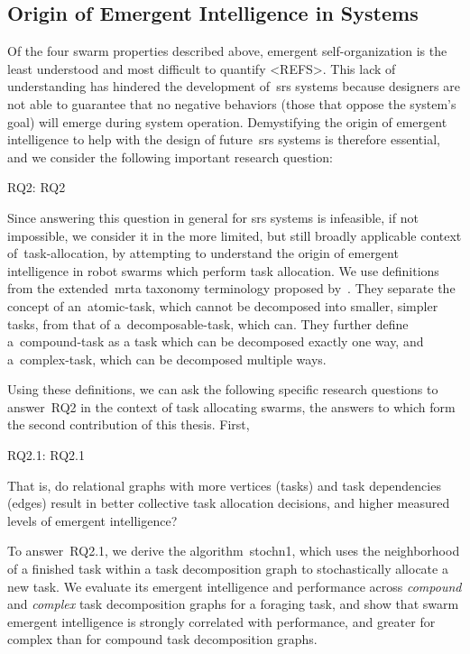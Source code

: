 \subsection{Origin of Emergent Intelligence in  Systems}
%
Of the four swarm properties described above, emergent self-organization is the
least understood and most difficult to quantify <REFS>. This lack of
understanding has hindered the development of~\gls{srs} systems because
designers are not able to guarantee that no negative behaviors (those that
oppose the system's goal) will emerge during system operation. Demystifying the
origin of emergent intelligence to help with the design of future~\gls{srs}
systems is therefore essential, and we consider the following important research
question:

\medskip\noindent
\gls{RQ2}: \glsdesc{RQ2}
\medskip

\noindent
Since answering this question in general for \gls{srs} systems is infeasible, if
not impossible, we consider it in the more limited, but still broadly applicable
context of~\gls{task-allocation}, by attempting to understand the origin of
emergent intelligence in robot swarms which perform task allocation. We use
definitions from the extended~\gls{mrta} taxonomy terminology proposed
by~\cite{Korsah2013}.  They separate the concept of an~\gls{atomic-task}, which
cannot be decomposed into smaller, simpler tasks, from that of
a~\gls{decomposable-task}, which can. They further define a~\gls{compound-task}
as a task which can be decomposed exactly one way, and a~\gls{complex-task},
which can be decomposed multiple ways.

Using these definitions, we can ask the following specific research questions to
answer~\gls{RQ2} in the context of task allocating swarms, the answers to which
form the second contribution of this thesis. First,

\medskip\noindent
\gls{RQ2.1}: \glsdesc{RQ2.1}
\medskip

\noindent
That is, do relational graphs with more vertices (tasks) and task dependencies
(edges) result in better collective task allocation decisions, and higher
measured levels of emergent intelligence?

To answer~\gls{RQ2.1}, we derive the algorithm~\gls{stochn1}, which uses the
neighborhood of a finished task within a task decomposition graph to
stochastically allocate a new task. We evaluate its emergent intelligence and
performance across \emph{compound} and \emph{complex} task decomposition graphs
for a foraging task, and show that swarm emergent intelligence is strongly
correlated with performance, and greater for complex than for compound task
decomposition graphs.

